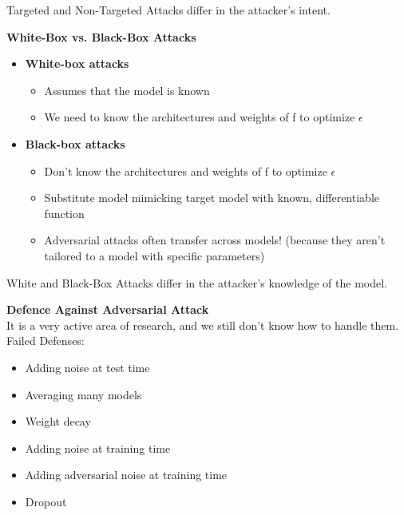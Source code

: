 \begin{idea}
    Targeted and Non-Targeted Attacks differ in the attacker's intent.
\end{idea}
\noindent
\textbf{White-Box vs. Black-Box Attacks}
\begin{itemize}
    \item \textbf{White-box attacks}
    \begin{itemize}
        \item Assumes that the model is known
    \end{itemize}
    \begin{itemize}
        \item We need to know the architectures and weights of f to optimize $\epsilon$ 
    \end{itemize}
    \item \textbf{Black-box attacks}
\begin{itemize}
    \item Don’t know the architectures and weights of f to optimize $\epsilon$
\end{itemize}
\begin{itemize}
    \item Substitute model mimicking target model with known, differentiable function
\end{itemize}
\begin{itemize}
    \item Adversarial attacks often transfer across models! (because they aren't tailored to a model with specific parameters)
\end{itemize}

\end{itemize}

\begin{idea}
    White and Black-Box Attacks differ in the attacker's knowledge of the model.
\end{idea}
\noindent
\textbf{Defence Against Adversarial Attack}\\
It is a very active area of research, and we still don’t know how to handle them. Failed Defenses:
\begin{itemize}
    \item Adding noise at test time
    \item Averaging many models
    \item Weight decay
    \item Adding noise at training time
    \item Adding adversarial noise at training time
    \item Dropout
\end{itemize}
